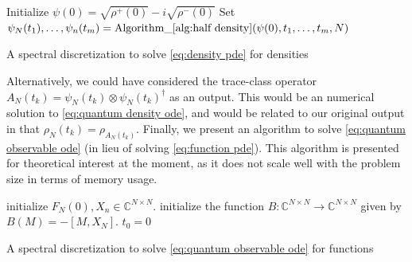 \documentclass[final,leqno]{siamltex1213}
\DeclareMathOperator{\OdeSolve}{OdeSolve}
\begin{document}
\begin{algorithm}[H] 
	Initialize $\psi(0) =  \sqrt{\rho^{+}(0)} - i \sqrt{\rho^{-}(0)}$\;
	Set $\psi_{N}(t_{1}),\dots,\psi_{n}(t_{m}) =  \operatorname{ Algorithm\_ \ref{alg:half density} }( \psi(0) , t_{1} , \dots,t_{m}, N )$\;
	\caption{A spectral discretization to solve \eqref{eq:density pde} for densities} \label{alg:density}
\end{algorithm}

Alternatively, we could have considered the trace-class operator $A_{N}(t_{k}) = \psi_{N}(t_{k}) \otimes \psi_{N}(t_{k})^{\dagger}$
as an output.  This would be an numerical solution to \eqref{eq:quantum density ode}, and would be related to our original output in that $\rho_{N}(t_{k}) = \rho_{A_{N}(t_{k})}$.
Finally, we present an algorithm to solve \eqref{eq:quantum observable ode} (in lieu of solving \eqref{eq:function pde}).
This algorithm is presented for theoretical interest at the moment, as it does not scale well with the problem size in terms of memory usage.

\begin{algorithm}[H]
	
	initialize $F_{N}(0), X_{n} \in \mathbb{C}^{N \times N}$.\;
	initialize the function $B: \mathbb{C}^{N \times N} \to \mathbb{C}^{N \times N}$
	given by $B(M) = - [M , X_{N}]$.\;
	$t_{0} = 0$\;
	\For{ $k = 1 ,\dots, m $}{
		$F_{N}(t_{k}) = \OdeSolve( B , F_{N}(t_{k-1}) , t_{k})$\;
	}
	\caption{A spectral discretization to solve \eqref{eq:quantum observable ode} for functions} \label{alg:function}
\end{algorithm}
\end{document}
